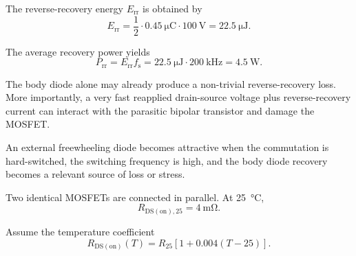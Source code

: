 
\begin{solutionblock}
    The reverse-recovery energy $E_\mathrm{rr}$ is obtained by
    \begin{equation}
        E_\mathrm{rr}
        = \frac{1}{2} \cdot \SI{0.45}{\micro\coulomb} \cdot \SI{100}{\volt}
        = \SI{22.5}{\micro\joule}.
    \end{equation}
\end{solutionblock}


\begin{solutionblock}
    The average recovery power yields
    \begin{equation}
        P_\mathrm{rr} = E_\mathrm{rr} f_\mathrm{s}
        = \SI{22.5}{\micro\joule} \cdot \SI{200}{\kilo\hertz}
        = \SI{4.5}{\watt}.
    \end{equation}
\end{solutionblock}


\begin{solutionblock}
    The body diode alone may already produce a non-trivial reverse-recovery loss. 
    More importantly, a very fast reapplied drain-source voltage plus reverse-recovery current can interact with the parasitic bipolar transistor and damage the MOSFET.

    An external freewheeling diode becomes attractive when the commutation is hard-switched, the switching frequency is high, and the body diode recovery becomes a relevant source of loss or stress.
\end{solutionblock}




Two identical MOSFETs are connected in parallel. At \SI{25}{\celsius},
\begin{equation}
    R_\mathrm{DS(on),25} = \SI{4}{\milli\ohm}.
\end{equation}

Assume the temperature coefficient
\begin{equation}
    R_\mathrm{DS(on)}(T) = R_{25} \left[ 1 + 0.004(T - 25) \right].
\end{equation}


